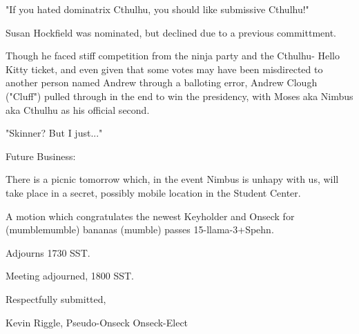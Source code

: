 \documentclass[10pt]{article}
\begin{document}
"If you hated dominatrix Cthulhu, you should like submissive Cthulhu!"

Susan Hockfield was nominated, but declined due to a previous committment.

Though he faced stiff competition from the ninja party and the Cthulhu-
Hello Kitty ticket, and even given that some votes may have been misdirected
to another person named Andrew through a balloting error, Andrew Clough 
("Cluff") pulled through in the end to win the presidency, with Moses aka
Nimbus aka Cthulhu as his official second.

"Skinner?  But I just..."

Future Business:

There is a picnic tomorrow which, in the event Nimbus is unhapy with us, will
take place in a secret, possibly mobile location in the Student Center. 

A motion which congratulates the newest Keyholder and Onseck for (mumblemumble) bananas (mumble) passes 15-llama-3+Spehn.

Adjourns 1730 SST.

\noindent
Meeting adjourned, 1800 SST.

\vspace{18pt}

\centerline{Respectfully submitted,}
\centerline{Kevin Riggle, Pseudo-Onseck Onseck-Elect}
\end{document}
